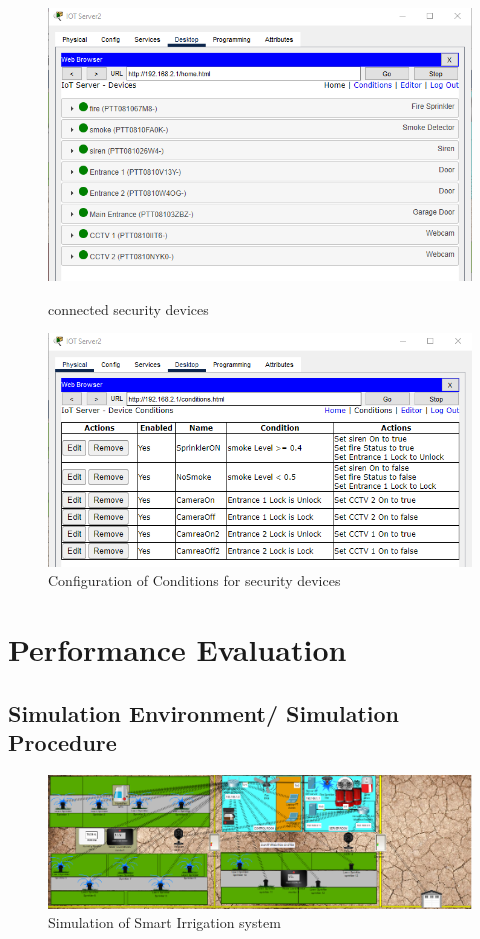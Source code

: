 \documentclass{report}
\begin{document}
\begin{figure}[h]
    \begin{minipage}{0.45\textwidth}
    \centering
    \includegraphics[width=1\textwidth]{As/3c.png}
    \caption{connected security devices}
    \label{fig:12}
    \end{minipage}
    \hfill
    \begin{minipage}{0.45\textwidth}
    \centering
    \includegraphics[width=1\textwidth]{As/4c.png}
    \caption{Configuration of Conditions for security devices}
    \label{fig:13}
    \end{minipage}
    
\end{figure}

\chapter{Performance Evaluation}
\section{Simulation Environment/ Simulation Procedure}
\begin{figure}[h]
    \centering
    \includegraphics[width=1\textwidth]{Sim.png}
    \caption{Simulation of Smart Irrigation system}
    \label{fig:my_label}
\end{figure}
\end{document}
